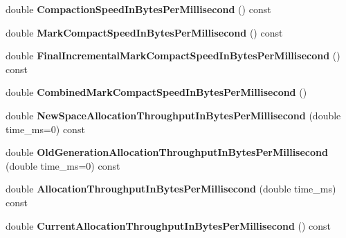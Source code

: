 \begin{DoxyCompactItemize}
\item 
double {\bfseries Compaction\+Speed\+In\+Bytes\+Per\+Millisecond} () const \hypertarget{classv8_1_1internal_1_1_g_c_tracer_a5eddcd81d54625e74f4e00bc901e13ba}{}\label{classv8_1_1internal_1_1_g_c_tracer_a5eddcd81d54625e74f4e00bc901e13ba}

\item 
double {\bfseries Mark\+Compact\+Speed\+In\+Bytes\+Per\+Millisecond} () const \hypertarget{classv8_1_1internal_1_1_g_c_tracer_a234bf70aef9834bd0f1b48149a2ae27b}{}\label{classv8_1_1internal_1_1_g_c_tracer_a234bf70aef9834bd0f1b48149a2ae27b}

\item 
double {\bfseries Final\+Incremental\+Mark\+Compact\+Speed\+In\+Bytes\+Per\+Millisecond} () const \hypertarget{classv8_1_1internal_1_1_g_c_tracer_afe4afc20c9871ca100b8f3e69dc9e5fd}{}\label{classv8_1_1internal_1_1_g_c_tracer_afe4afc20c9871ca100b8f3e69dc9e5fd}

\item 
double {\bfseries Combined\+Mark\+Compact\+Speed\+In\+Bytes\+Per\+Millisecond} ()\hypertarget{classv8_1_1internal_1_1_g_c_tracer_a2181fbcea7dbac27153923601b09f0dd}{}\label{classv8_1_1internal_1_1_g_c_tracer_a2181fbcea7dbac27153923601b09f0dd}

\item 
double {\bfseries New\+Space\+Allocation\+Throughput\+In\+Bytes\+Per\+Millisecond} (double time\+\_\+ms=0) const \hypertarget{classv8_1_1internal_1_1_g_c_tracer_abc75fa0d9d60805b03f142b53e8405ef}{}\label{classv8_1_1internal_1_1_g_c_tracer_abc75fa0d9d60805b03f142b53e8405ef}

\item 
double {\bfseries Old\+Generation\+Allocation\+Throughput\+In\+Bytes\+Per\+Millisecond} (double time\+\_\+ms=0) const \hypertarget{classv8_1_1internal_1_1_g_c_tracer_a7e7b088bac1d8e50af203acbde01f900}{}\label{classv8_1_1internal_1_1_g_c_tracer_a7e7b088bac1d8e50af203acbde01f900}

\item 
double {\bfseries Allocation\+Throughput\+In\+Bytes\+Per\+Millisecond} (double time\+\_\+ms) const \hypertarget{classv8_1_1internal_1_1_g_c_tracer_a643f1e7b5b92c7fe5a9970b8a9f6c75d}{}\label{classv8_1_1internal_1_1_g_c_tracer_a643f1e7b5b92c7fe5a9970b8a9f6c75d}

\item 
double {\bfseries Current\+Allocation\+Throughput\+In\+Bytes\+Per\+Millisecond} () const \hypertarget{classv8_1_1internal_1_1_g_c_tracer_a9f932cd1223e7ddafae3bf0c139321d0}{}\label{classv8_1_1internal_1_1_g_c_tracer_a9f932cd1223e7ddafae3bf0c139321d0}


\end{DoxyCompactItemize}
